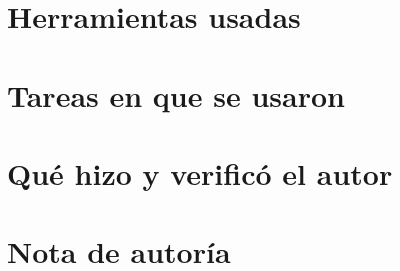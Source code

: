\section*{Herramientas usadas}

\section*{Tareas en que se usaron}

\section*{Qué hizo y verificó el autor}

\section*{Nota de autoría}
